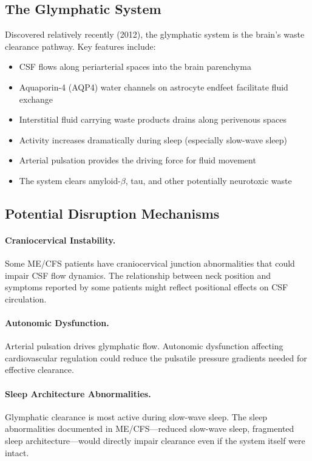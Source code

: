 \subsection{The Glymphatic System}

Discovered relatively recently (2012), the glymphatic system is the brain's waste clearance pathway. Key features include:

\begin{itemize}
    \item CSF flows along periarterial spaces into the brain parenchyma
    \item Aquaporin-4 (AQP4) water channels on astrocyte endfeet facilitate fluid exchange
    \item Interstitial fluid carrying waste products drains along perivenous spaces
    \item Activity increases dramatically during sleep (especially slow-wave sleep)
    \item Arterial pulsation provides the driving force for fluid movement
    \item The system clears amyloid-$\beta$, tau, and other potentially neurotoxic waste
\end{itemize}

\subsection{Potential Disruption Mechanisms}

\paragraph{Craniocervical Instability.} Some ME/CFS patients have craniocervical junction abnormalities that could impair CSF flow dynamics. The relationship between neck position and symptoms reported by some patients might reflect positional effects on CSF circulation.

\paragraph{Autonomic Dysfunction.} Arterial pulsation drives glymphatic flow. Autonomic dysfunction affecting cardiovascular regulation could reduce the pulsatile pressure gradients needed for effective clearance.

\paragraph{Sleep Architecture Abnormalities.} Glymphatic clearance is most active during slow-wave sleep. The sleep abnormalities documented in ME/CFS---reduced slow-wave sleep, fragmented sleep architecture---would directly impair clearance even if the system itself were intact.

